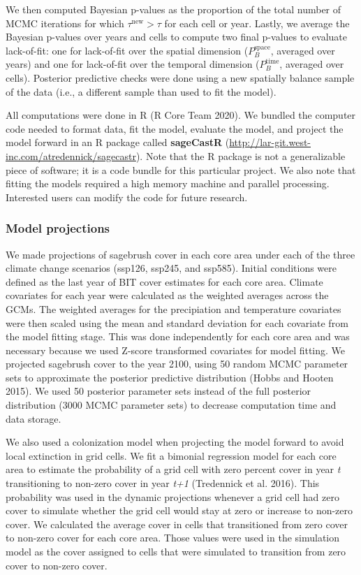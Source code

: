 \documentclass[
  12pt,
]{article}
\begin{document}
\noindent{}We then computed Bayesian p-values as the proportion of the total number of MCMC iterations for which \(\tau^{\text{new}} > \tau\) for each cell or year.
Lastly, we average the Bayesian p-values over years and cells to compute two final p-values to evaluate lack-of-fit: one for lack-of-fit over the spatial dimension (\(P_B^{\text{space}}\), averaged over years) and one for lack-of-fit over the temporal dimension (\(P_B^{\text{time}}\), averaged over cells).
Posterior predictive checks were done using a new spatially balance sample of the data (i.e., a different sample than used to fit the model).

All computations were done in R (R Core Team 2020).
We bundled the computer code needed to format data, fit the model, evaluate the model, and project the model forward in an R package called \textbf{sageCastR} (\url{http://lar-git.west-inc.com/atredennick/sagecastr}).
Note that the R package is not a generalizable piece of software; it is a code bundle for this particular project.
We also note that fitting the models required a high memory machine and parallel processing.
Interested users can modify the code for future research.

\hypertarget{model-projections}{%
\subsubsection{Model projections}\label{model-projections}}

We made projections of sagebrush cover in each core area under each of the three climate change scenarios (ssp126, ssp245, and ssp585).
Initial conditions were defined as the last year of BIT cover estimates for each core area.
Climate covariates for each year were calculated as the weighted averages across the GCMs.
The weighted averages for the precipiation and temperature covariates were then scaled using the mean and standard deviation for each covariate from the model fitting stage.
This was done independently for each core area and was necessary because we used Z-score transformed covariates for model fitting.
We projected sagebrush cover to the year 2100, using 50 random MCMC parameter sets to approximate the posterior predictive distribution (Hobbs and Hooten 2015).
We used 50 posterior parameter sets instead of the full posterior distribution (3000 MCMC parameter sets) to decrease computation time and data storage.

We also used a colonization model when projecting the model forward to avoid local extinction in grid cells.
We fit a bimonial regression model for each core area to estimate the probability of a grid cell with zero percent cover in year \emph{t} transitioning to non-zero cover in year \emph{t+1} (Tredennick et al. 2016).
This probability was used in the dynamic projections whenever a grid cell had zero cover to simulate whether the grid cell would stay at zero or increase to non-zero cover.
We calculated the average cover in cells that transitioned from zero cover to non-zero cover for each core area.
Those values were used in the simulation model as the cover assigned to cells that were simulated to transition from zero cover to non-zero cover.
\end{document}
